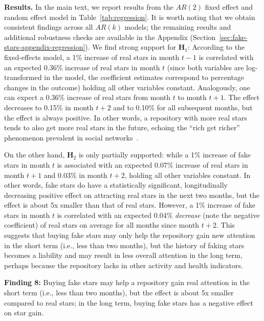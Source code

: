 \textbf{Results.}
In the main text, we report results from the $AR(2)$ fixed effect and random effect model in Table~\ref{tab:regression}.
It is worth noting that we obtain consistent findings across all $AR(k)$ models; the remaining results and additional robustness checks are available in the Appendix (Section~\ref{sec:fake-stars-appendix-regression}).
We find strong support for  \textbf{H$_1$}:
According to the fixed-effects model,  a 1\% increase of real stars in month $t-1$ is correlated with an expected 0.36\% increase of real stars in month $t$ 
(since both variables are log-transformed in the model, the coefficient estimates correspond to percentage changes in the outcome)
holding all other variables constant. 
Analogously, one can expect a 0.36\% increase of real stars from month $t$ to month $t+1$.
The effect decreases to 0.15\% %
in month $t+2$ and to 0.10\% %
for all subsequent months, but the effect is always positive.
In other words, a repository with more real stars tends to also get more real stars in the future, echoing the ``rich get richer'' phenomenon prevalent in social networks~\cite{DBLP:journals/corr/ZhuL16, hagar2022concentration}.

On the other hand, \textbf{H$_2$} is only partially supported: while a 1\% increase of fake stars in month $t$ is associated with an expected 0.07\% %
increase of real stars in month $t + 1$ and 0.03\% %
in month $t+2$, holding all other variables constant.
In other words, fake stars do have a statistically significant, longitudinally decreasing positive effect on attracting real stars in the next two months, but the effect is about 5x smaller than that of real stars. 
However, a 1\% increase of fake stars in month $t$ is correlated with an expected 0.04\% %
\emph{decrease} (note the negative coefficient) of real stars on average for all months since month $t+2$.
This suggests that buying fake stars may only help the repository gain new attention in the short term (i.e., less than two months), but the history of faking stars becomes a liability and may result in less overall attention in the long term, perhaps because the repository lacks in other activity and health indicators.

\begin{summary-rq}
\textbf{Finding 8:} Buying fake stars may help a repository gain real attention in the short term (i.e., less than two months), but the effect is about 5x smaller compared to real stars; in the long term, buying fake stars has a negative effect on star gain.
\end{summary-rq}

